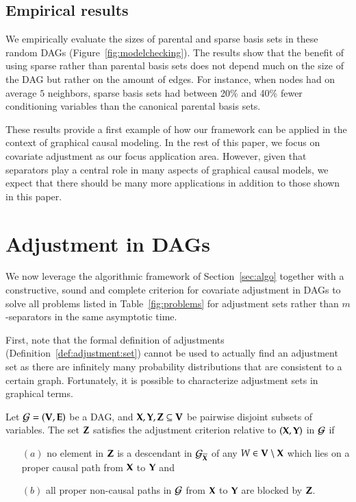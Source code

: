 \subsection{Empirical results}

We empirically evaluate the sizes of parental and sparse basis sets in these random DAGs (Figure~\ref{fig:modelchecking}). 
The results show that the benefit of using sparse rather than parental basis sets does not depend much on the size of the DAG but rather on the amount of edges. For instance, when nodes had on average $5$ neighbors, sparse basis sets had between 20\% and 40\% fewer conditioning variables than the canonical parental basis sets.

These results provide a first example of how our framework can be applied in the context of graphical causal modeling. In the rest of this paper, we focus on covariate adjustment as our focus application area. However, given that separators play a central role in many aspects of graphical causal models, we expect that there should be many more applications in addition to those shown in this paper.



\section{Adjustment in DAGs}

\label{sec:dagadjust}

We now leverage the algorithmic
framework of Section~\ref{sec:algo} together with a 
constructive, sound and complete criterion 
for covariate adjustment in DAGs to solve all problems
listed in Table~\ref{fig:problems} for adjustment %
sets rather than $m$-separators in the same
asymptotic time.  %
%
%
%
%
%
%
%
%
%
%
%
%
%
%


First, note that the formal definition of 
adjustments (Definition~\ref{def:adjustment:set}) 
cannot be used to actually find an adjustment set as there 
are infinitely many probability distributions that are consistent to a certain graph. 
Fortunately, it is possible to characterize adjustment sets in graphical terms.

\begin{definition}\label{def:ac:general}
Let ${\cal G} = ({\bf V},{\bf E})$ be a DAG, and ${\bf X},{\bf Y},{\bf Z} \subseteq {\bf V}$ 
be pairwise disjoint subsets of variables. 
The set ${\bf Z}$ satisfies the adjustment criterion relative to $({\bf X}, {\bf Y})$ in ${\cal G}$ if 
\begin{enumerate}
   \item[$(a)$] 
    no element in ${\bf Z}$ is a descendant in ${\cal G}_{\overline{{\bf X}}}$ %
    of any $W \in {\bf V} \setminus {\bf X}$ 
   which lies on a proper causal path from ${\bf X}$ to ${\bf Y}$
   and 
   \item[$(b)$]
   all proper non-causal paths in ${\cal G}$ from ${\bf X}$ to ${\bf Y}$ are blocked by ${\bf Z}$.
\end{enumerate}
\end{definition}
 
